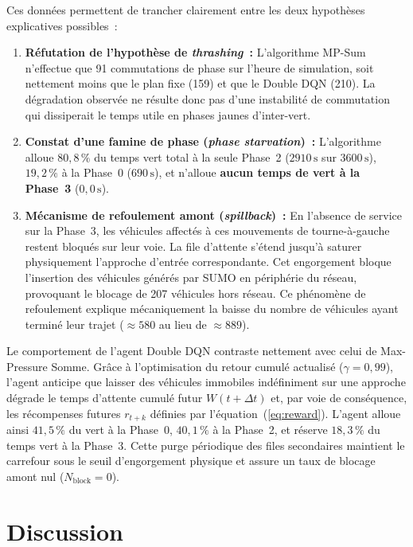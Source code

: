 \documentclass[11pt,a4paper]{article}
\begin{document}
Ces données permettent de trancher clairement entre les deux hypothèses explicatives possibles~:
\begin{enumerate}
    \item \textbf{Réfutation de l'hypothèse de \emph{thrashing}~:} L'algorithme MP-Sum n'effectue que 91 commutations de phase sur l'heure de simulation, soit nettement moins que le plan fixe (159) et que le Double DQN (210). La dégradation observée ne résulte donc pas d'une instabilité de commutation qui dissiperait le temps utile en phases jaunes d'inter-vert.
    \item \textbf{Constat d'une famine de phase (\emph{phase starvation})~:} L'algorithme alloue $80{,}8\,\%$ du temps vert total à la seule Phase~2 ($2910\,\mathrm{s}$ sur $3600\,\mathrm{s}$), $19{,}2\,\%$ à la Phase~0 ($690\,\mathrm{s}$), et n'alloue \textbf{aucun temps de vert à la Phase~3} ($0{,}0\,\mathrm{s}$).
    \item \textbf{Mécanisme de refoulement amont (\emph{spillback})~:} En l'absence de service sur la Phase~3, les véhicules affectés à ces mouvements de tourne-à-gauche restent bloqués sur leur voie. La file d'attente s'étend jusqu'à saturer physiquement l'approche d'entrée correspondante. Cet engorgement bloque l'insertion des véhicules générés par SUMO en périphérie du réseau, provoquant le blocage de 207 véhicules hors réseau. Ce phénomène de refoulement explique mécaniquement la baisse du nombre de véhicules ayant terminé leur trajet ($\approx 580$ au lieu de $\approx 889$).
\end{enumerate}

Le comportement de l'agent Double DQN contraste nettement avec celui de Max-Pressure Somme. Grâce à l'optimisation du retour cumulé actualisé ($\gamma = 0{,}99$), l'agent anticipe que laisser des véhicules immobiles indéfiniment sur une approche dégrade le temps d'attente cumulé futur $W(t + \Delta t)$ et, par voie de conséquence, les récompenses futures $r_{t+k}$ définies par l'équation~(\ref{eq:reward}). L'agent alloue ainsi $41{,}5\,\%$ du vert à la Phase~0, $40{,}1\,\%$ à la Phase~2, et réserve $18{,}3\,\%$ du temps vert à la Phase~3. Cette purge périodique des files secondaires maintient le carrefour sous le seuil d'engorgement physique et assure un taux de blocage amont nul ($N_{\text{block}} = 0$).

\section{Discussion}
\label{sec:discussion}
\end{document}
